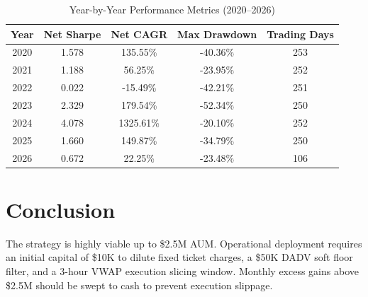 \documentclass[11pt,a4paper]{article}
\begin{document}
\begin{table}[htbp]
\centering
\caption{Year-by-Year Performance Metrics (2020--2026)}
\label{tab:yearly}
\begin{tabular}{ccccc}
\toprule
Year & Net Sharpe & Net CAGR & Max Drawdown & Trading Days \\
\midrule
2020 & 1.578 & 135.55\% & -40.36\% & 253 \\
2021 & 1.188 & 56.25\% & -23.95\% & 252 \\
2022 & 0.022 & -15.49\% & -42.21\% & 251 \\
2023 & 2.329 & 179.54\% & -52.34\% & 250 \\
2024 & 4.078 & 1325.61\% & -20.10\% & 252 \\
2025 & 1.660 & 149.87\% & -34.79\% & 250 \\
2026 & 0.672 & 22.25\% & -23.48\% & 106 \\
\bottomrule
\end{tabular}
\end{table}

\section{Conclusion}
The strategy is highly viable up to \$2.5M AUM. Operational deployment requires an initial capital of \$10K to dilute fixed ticket charges, a \$50K DADV soft floor filter, and a 3-hour VWAP execution slicing window. Monthly excess gains above \$2.5M should be swept to cash to prevent execution slippage.
\end{document}
